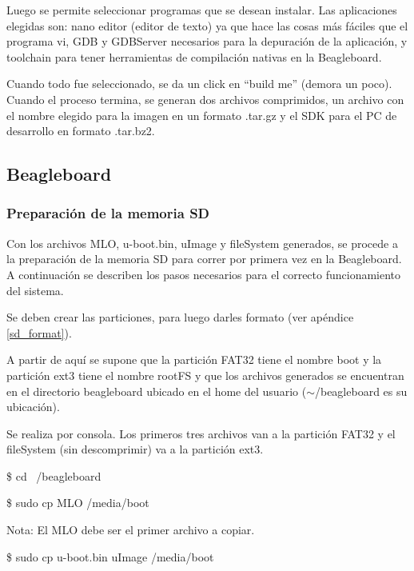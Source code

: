 \bigskip
Luego se permite seleccionar programas que se desean instalar.
Las aplicaciones elegidas son: nano editor (editor de texto) ya que hace las cosas más fáciles que el programa vi, GDB y GDBServer necesarios para la depuración de la aplicación, y toolchain para tener herramientas de compilación nativas en la Beagleboard.

\bigskip
Cuando todo fue seleccionado, se da un click en “build me” (demora un poco).
Cuando el proceso termina, se generan dos archivos comprimidos, un archivo con el nombre elegido para la imagen en un formato .tar.gz y el SDK para el PC de desarrollo en formato .tar.bz2. 

\newpage
\subsection{Beagleboard}

\subsubsection{Preparación de la memoria SD}

Con los archivos MLO, u-boot.bin, uImage y fileSystem generados, se procede a la preparación de la memoria SD para correr por primera vez en la Beagleboard. A continuación se describen los pasos necesarios para el correcto funcionamiento del sistema.

\bigskip
{}

\bigskip
Se deben crear las particiones, para luego darles formato (ver apéndice \ref{sd_format}).

\bigskip
A partir de aquí se supone que la partición FAT32 tiene el nombre boot y la partición ext3 tiene el nombre rootFS y que los archivos generados se encuentran en el directorio beagleboard ubicado en el home del usuario ($\sim$/beagleboard es su ubicación).

\bigskip
{}

\bigskip
Se realiza por consola. 
Los primeros tres archivos van a la partición FAT32 y el fileSystem (sin descomprimir) va a la 
partición ext3.

\bigskip
\centerline{\$ cd ~/beagleboard}

\centerline{\$ sudo cp MLO /media/boot} 

Nota: El MLO debe ser el primer archivo a copiar.

\bigskip
\centerline{\$ sudo cp u-boot.bin uImage /media/boot}

